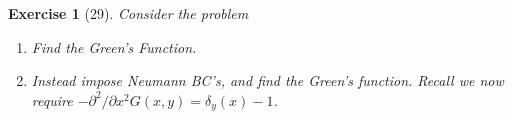 \documentclass[letterpaper,twoside,11pt]{article}
\theoremstyle{mystyle}
\newtheorem*{exercise}{Exercise}
\begin{document}
\newpage 
\begin{exercise}[29]
  Consider the problem 

  \begin{enumerate}
    \item Find the Green's Function. 
    \item Instead impose Neumann BC's, and find the Green's function. Recall we now require $-\partial^2/\partial x^2 G(x, y) = \delta_y(x) -1$.
  \end{enumerate}
\end{exercise}
\end{document}
